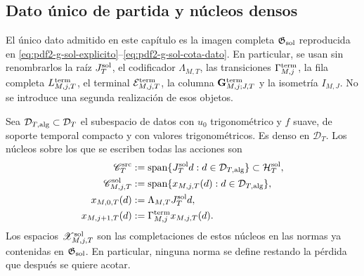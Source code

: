 \subsection{Dato único de partida y núcleos densos}

El único dato admitido en este capítulo es la imagen completa
$\mathfrak G_{\rm sol}$ reproducida en
\eqref{eq:pdf2-g-sol-explicito}--\eqref{eq:pdf2-g-sol-cota-dato}. En particular,
se usan sin renombrarlos la raíz $J_T^{\rm sol}$, el codificador
$\Lambda_{M,T}$, las transiciones $\Gamma_{M,j}^{\rm term}$, la fila completa
$L_{M,j,T}^{\rm term}$, el terminal $\mathcal E_{M,j,T}^{\rm term}$, la columna
$\mathbf G_{M,j;J,T}^{\rm term}$ y la isometría $I_{M,J}$. No se introduce una
segunda realización de esos objetos.

Sea $\mathcal D_{T,{\rm alg}}\subset\mathcal D_T$ el subespacio de datos con
$u_0$ trigonométrico y $f$ suave, de soporte temporal compacto y con valores
trigonométricos. Es denso en $\mathcal D_T$. Los núcleos sobre los que se
escriben todas las acciones son
\begin{equation}\label{eq:pdf2-ns-cyclic-cores}
 \begin{aligned}
 \mathscr C_T^{\rm src}
 &:=\operatorname{span}\{J_T^{\rm sol}d:d\in\mathcal D_{T,{\rm alg}}\}
 \subset\mathcal H_T^{\rm sol},\\
 \mathscr C_{M,j,T}^{\rm sol}
 &:=\operatorname{span}\{x_{M,j,T}(d):d\in\mathcal D_{T,{\rm alg}}\},\\
 x_{M,0,T}(d)&:=\Lambda_{M,T}J_T^{\rm sol}d,\\
 x_{M,j+1,T}(d)&:=\Gamma_{M,j}^{\rm term}x_{M,j,T}(d).
 \end{aligned}
\end{equation}
Los espacios $\mathscr X_{M,j,T}^{\rm sol}$ son las completaciones de estos
núcleos en las normas ya contenidas en $\mathfrak G_{\rm sol}$. En particular,
ninguna norma se define restando la pérdida que después se quiere acotar.

